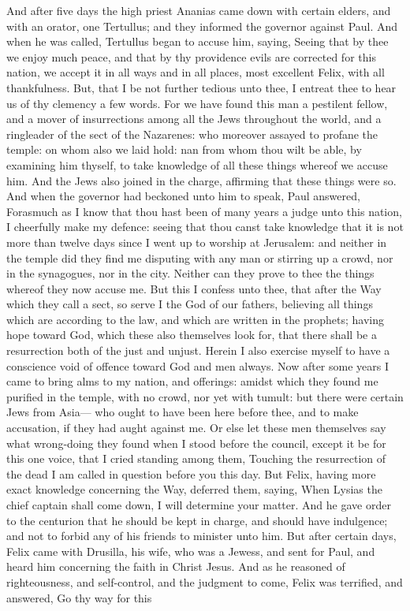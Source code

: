 And after five days the high priest Ananias came down with certain elders, and with an orator, one Tertullus; and they informed the governor against Paul. And when he was called, Tertullus began to accuse him, saying, Seeing that by thee we enjoy much peace, and that by thy providence evils are corrected for this nation, we accept it in all ways and in all places, most excellent Felix, with all thankfulness. But, that I be not further tedious unto thee, I entreat thee to hear us of thy clemency a few words. For we have found this man a pestilent fellow, and a mover of insurrections among all the Jews throughout the world, and a ringleader of the sect of the Nazarenes: who moreover assayed to profane the temple: on whom also we laid hold: nan from whom thou wilt be able, by examining him thyself, to take knowledge of all these things whereof we accuse him. And the Jews also joined in the charge, affirming that these things were so.  And when the governor had beckoned unto him to speak, Paul answered, Forasmuch as I know that thou hast been of many years a judge unto this nation, I cheerfully make my defence: seeing that thou canst take knowledge that it is not more than twelve days since I went up to worship at Jerusalem: and neither in the temple did they find me disputing with any man or stirring up a crowd, nor in the synagogues, nor in the city. Neither can they prove to thee the things whereof they now accuse me. But this I confess unto thee, that after the Way which they call a sect, so serve I the God of our fathers, believing all things which are according to the law, and which are written in the prophets; having hope toward God, which these also themselves look for, that there shall be a resurrection both of the just and unjust. Herein I also exercise myself to have a conscience void of offence toward God and men always. Now after some years I came to bring alms to my nation, and offerings: amidst which they found me purified in the temple, with no crowd, nor yet with tumult: but there were certain Jews from Asia— who ought to have been here before thee, and to make accusation, if they had aught against me. Or else let these men themselves say what wrong-doing they found when I stood before the council, except it be for this one voice, that I cried standing among them, Touching the resurrection of the dead I am called in question before you this day.  But Felix, having more exact knowledge concerning the Way, deferred them, saying, When Lysias the chief captain shall come down, I will determine your matter. And he gave order to the centurion that he should be kept in charge, and should have indulgence; and not to forbid any of his friends to minister unto him.  But after certain days, Felix came with Drusilla, his wife, who was a Jewess, and sent for Paul, and heard him concerning the faith in Christ Jesus. And as he reasoned of righteousness, and self-control, and the judgment to come, Felix was terrified, and answered, Go thy way for this 